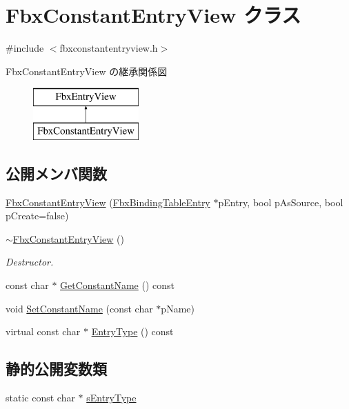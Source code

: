 \hypertarget{class_fbx_constant_entry_view}{}\section{Fbx\+Constant\+Entry\+View クラス}
\label{class_fbx_constant_entry_view}


{\ttfamily \#include $<$fbxconstantentryview.\+h$>$}

Fbx\+Constant\+Entry\+View の継承関係図\begin{figure}[H]
\begin{center}
\leavevmode
\includegraphics[height=2.000000cm]{class_fbx_constant_entry_view}
\end{center}
\end{figure}
\subsection*{公開メンバ関数}
\begin{DoxyCompactItemize}
\item 
\hyperlink{class_fbx_constant_entry_view_af49c9691fe825c0b62b3abe96c7ca823}{Fbx\+Constant\+Entry\+View} (\hyperlink{class_fbx_binding_table_entry}{Fbx\+Binding\+Table\+Entry} $\ast$p\+Entry, bool p\+As\+Source, bool p\+Create=false)
\item 
\hyperlink{class_fbx_constant_entry_view_a2d48b5460eb2b55547c0156d1774222e}{$\sim$\+Fbx\+Constant\+Entry\+View} ()
\begin{DoxyCompactList}\small\item\em Destructor. \end{DoxyCompactList}\item 
const char $\ast$ \hyperlink{class_fbx_constant_entry_view_a5e61786ae363b4281f5515e225722700}{Get\+Constant\+Name} () const
\item 
void \hyperlink{class_fbx_constant_entry_view_abe9370dc86bcdfb7b9ef617d2317f4b2}{Set\+Constant\+Name} (const char $\ast$p\+Name)
\item 
virtual const char $\ast$ \hyperlink{class_fbx_constant_entry_view_a7ea7fc9df5e1316854d18ffcc797e564}{Entry\+Type} () const
\end{DoxyCompactItemize}
\subsection*{静的公開変数類}
\begin{DoxyCompactItemize}
\item 
static const char $\ast$ \hyperlink{class_fbx_constant_entry_view_a9613da66bae01aaedaf6a08f6f538126}{s\+Entry\+Type}
\end{DoxyCompactItemize}
